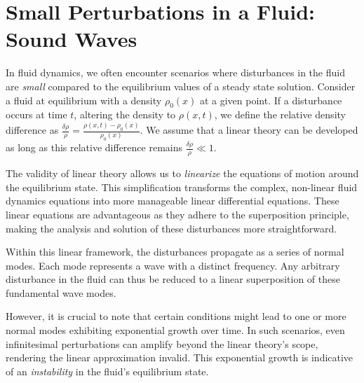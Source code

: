 %
%
%
%
%
%
%
%

\section{Small Perturbations in a Fluid: Sound Waves}

In fluid dynamics, we often encounter scenarios where disturbances in the fluid are \emph{small} compared to the equilibrium values of a steady state solution. 
%
Consider a fluid at equilibrium with a density \(\rho_0(x)\) at a given point. If a disturbance occurs at time \(t\), altering the density to \(\rho(x, t)\), we define the relative density difference as \( \frac{\delta \rho}{\rho} = \frac{\rho(x, t) - \rho_0(x)}{\rho_0(x)} \). 
%
We assume that a linear theory can be developed as long as this relative difference remains  \( \frac{\delta \rho}{\rho} \ll 1 \).

The validity of linear theory allows us to \emph{linearize} the equations of motion around the equilibrium state. This simplification transforms the complex, non-linear fluid dynamics equations into more manageable linear differential equations. These linear equations are advantageous as they adhere to the superposition principle, making the analysis and solution of these disturbances more straightforward.

Within this linear framework, the disturbances propagate as a series of normal modes. Each mode represents a wave with a distinct frequency. Any arbitrary disturbance in the fluid can thus be reduced to a linear superposition of these fundamental wave modes. 

However, it is crucial to note that certain conditions might lead to one or more normal modes exhibiting exponential growth over time. In such scenarios, even infinitesimal perturbations can amplify beyond the linear theory's scope, rendering the linear approximation invalid. This exponential growth is indicative of an \emph{instability} in the fluid's equilibrium state.


